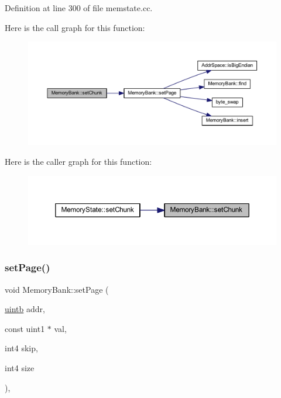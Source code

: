 Definition at line 300 of file memstate.\+cc.

Here is the call graph for this function\+:
\nopagebreak
\begin{figure}[H]
\begin{center}
\leavevmode
\includegraphics[width=350pt]{class_memory_bank_a99ed4c66d1ea57306e6bd9ed1a5de787_cgraph}
\end{center}
\end{figure}
Here is the caller graph for this function\+:
\nopagebreak
\begin{figure}[H]
\begin{center}
\leavevmode
\includegraphics[width=350pt]{class_memory_bank_a99ed4c66d1ea57306e6bd9ed1a5de787_icgraph}
\end{center}
\end{figure}
\mbox{\label{class_memory_bank_a68bf2318442e1f7da99ae85f63f9df19}} 
\subsubsection{\texorpdfstring{setPage()}{setPage()}}
{\footnotesize\ttfamily void Memory\+Bank\+::set\+Page (\begin{DoxyParamCaption}\item[{\mbox{\hyperlink{types_8h_a2db313c5d32a12b01d26ac9b3bca178f}{uintb}}}]{addr,  }\item[{const uint1 $\ast$}]{val,  }\item[{int4}]{skip,  }\item[{int4}]{size }\end{DoxyParamCaption})\hspace{0.3cm}{\ttfamily [protected]}, {\ttfamily [virtual]}}



